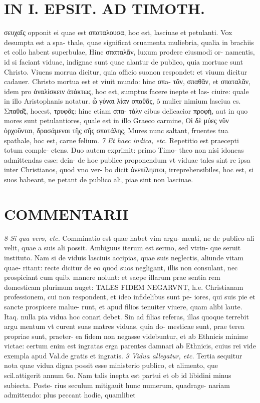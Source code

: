 \documentclass{article}
\begin{document}
\begin{pages}
\section*{IN I. EPSIT. AD TIMOTH. }\pstart σευχαῖς opponit ei quae est σπαταλουσα, hoc est, lasciuae et petulanti. Vox desumpta est a spa- thale, quae significat oruamenta muliebria, qualia in brachiis et collo habent superbulae, Hinc σπαταλᾶν, luxum prodere eiusmodi or- namentis, id si faciant viduae, indignae sunt quae alantur de publico, quia mortuae sunt Christo. Viuens morrua dicitur, quia officio suonon respondet: et viuum dicitur cadauer. Christo mortua est et viuit mundo: hinc σπa- τᾶν, σπαθᾶν, et σπαταλᾶν, idem pro ἀναλίσκειν ἀτάκτως, hoc est, sumptus facere inepte et las- ciuire: quale in illo Aristophanis notatur. ὦ γύναι λίαν σπαθᾶς, ô mulier nimium lasciua es. Σπαθα̃͂ς, hocest, τρυφᾶς: hinc etiam σπα- τάλν cibus delicacior προφὴ, aut in quo mores sunt petulantiores, quale est in illo Graeco carmine, Οἱ δὲ μύες νῦν ὀρχοῦνται, δρασάμενοι τῆς σῆς σπατάλης, Mures nunc saltant, fruentes tua spathale, hoc est, carne felium.  \pend
\textit{7 Et haec indica, etc. }\pstart Repetitio est praecepti totum comple- ctens. Duo autem exprimit: primo Timo- theo non nisi idoneas admittendas esse: dein- de hoc publice proponendum vt viduae tales sint re ipsa inter Christianos, quod vno ver- bo dicit ἀνεπίληπτοι, irreprehensibiles, hoc est, si suos habeant, ne petant de publico ali, piae sint non lasciuae.  \pend
\marginpar{[ p.125 ]}
\marginpar{[ p.126 ]}
\section*{COMMENTARII }
\textit{8 Si qua vero, etc. }\pstart Comminatio est quae habet vim argu- menti, ne de publico ali velit, quae a suis ali possit. Ambiguus iterum est sermo, sed vtrin- que seruit instituto. Nam si de viduis lasciuis accipias, quae suis neglectis, aliunde vitam quae- ritant: recte dicitur de eo quod suos negligant, illis non consulant, nec prospiciant cum quib. manere nolunt: et saepe illarum prae sentia rem domesticam plurimum auget: TALES FIDEM NEGARVNT, h.e. Christianam professionem, cui non respondent, et ideo infidelibus sunt pe- iores, qui suis pie et sancte prospicere malue- runt, et apud filios tenuiter viuere, quam alibi laute. Itaq. nulla pia vidua hoc conari debet. Sin ad filias referas, illas quoque terrebit argu mentum vt curent suas matres viduas, quia do- mesticae sunt, prae terea propriae sunt, praeter- ea fidem non negasse videbuntur, et ab Ethnicis minime victae: certum enim est ingratas erga parentes damnari ab Ethnicis, cuius rei vide exempla apud Val.de gratis et ingratis.  \pend
\textit{9 Vidua allegatur, etc. }\pstart Tertia sequitur nota quae vidua digna possit esse ministerio publico, et alimento, que scil.attigerit annum 6o. Nam talis inepta est partui et ob id libidini minus subiecta. Poste- rius seculum mitigauit hunc numerum, quadrage- nariam admittendo: plus peccant hodie, quamlibet  \pend

\end{pages}
\end{document}
